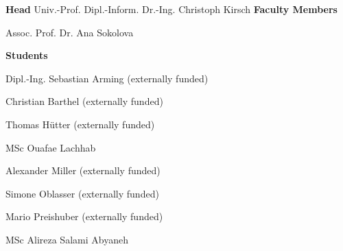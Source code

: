 \textcolor{\workinggroupboxtextcolor}{
	\textbf{Head}
	\newline
    \newline
	Univ.-Prof. Dipl.-Inform. Dr.-Ing. Christoph Kirsch
	\newline
    \newline
	\textbf{Faculty Members}
	\begin{compactitem}
	  \item Assoc. Prof. Dr. Ana Sokolova
	\end{compactitem}
	\vspace{0.5cm}
	\textbf{Students}
	\begin{compactitem}
	  \item Dipl.-Ing. Sebastian Arming (externally funded)
		\item Christian Barthel (externally funded)
	  \item Thomas H\"utter (externally funded)
	  \item MSc Ouafae Lachhab
	  \item Alexander Miller (externally funded)
		\item Simone Oblasser (externally funded)
	  \item Mario Preishuber (externally funded)
	  \item MSc Alireza Salami Abyaneh
	\end{compactitem}
}